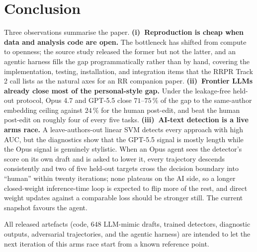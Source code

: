 \documentclass[runningheads]{llncs}
\begin{document}
\section{Conclusion}\label{sec:conclusion}

Three observations summarise the paper.
\textbf{(i)~Reproduction is cheap when data and analysis code are
open.} The bottleneck has shifted from compute to openness; the
source study released the former but not the latter, and an agentic
harness fills the gap programmatically rather than by hand,
covering the implementation, testing, installation, and integration
items that the RRPR Track\,2 call lists as the natural axes for an
RR companion paper.
\textbf{(ii)~Frontier LLMs already close most of the
personal-style gap.} Under the leakage-free held-out protocol, Opus
4.7 and GPT-5.5 close $71$--$75\,\%$ of the gap to the same-author
embedding ceiling against $24\,\%$ for the human post-edit, and beat
the human post-edit on roughly four of every five tasks.
\textbf{(iii)~AI-text detection is a live arms race.} A
leave-authors-out linear SVM detects every approach with high AUC,
but the diagnostics show that the GPT-5.5 signal is mostly length
while the Opus signal is genuinely stylistic. When an Opus agent
sees the detector's score on its own draft and is asked to lower
it, every trajectory descends consistently and two of five
held-out targets cross the decision boundary into ``human'' within
twenty iterations; none plateaus on the AI side, so a longer
closed-weight inference-time loop is expected to flip more of the
rest, and direct weight updates against a comparable loss should be
stronger still. The current snapshot favours the agent.

All released artefacts (code, $648$ LLM-mimic drafts, trained
detectors, diagnostic outputs, adversarial trajectories, and the
agentic harness) are intended to let the next iteration of this
arms race start from a known reference point.



\end{document}
